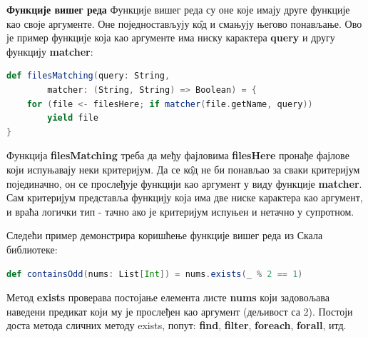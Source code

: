 \documentclass[12pt,oneside]{memoir}
\begin{document}
\begin{description}
	\item \textbf{Функције вишег реда} %
Функције вишег реда су оне које имају друге функције као своје аргументе. Оне поједностављују к\^{о}д и смањују његово понављање. Ово је пример функције која као аргументе има ниску карактера \textbf{query} и другу функцију \textbf{matcher}:
\begin{lstlisting}[language=Scala]
def filesMatching(query: String, 
		matcher: (String, String) => Boolean) = {
	for (file <- filesHere; if matcher(file.getName, query))
		yield file
}
\end{lstlisting}
Функција \textbf{filesMatching} треба да међу фајловима \textbf{filesHere} пронађе фајлове који испуњавају неки критеријум. Да се к\^{о}д не би понављао за сваки критеријум појединачно, он се прослеђује функцији као аргумент у виду функције \textbf{matcher}. Сам критеријум представља функцију која има две ниске карактера као аргумент, и враћа логички тип - тачно ако је критеријум испуњен и нетачно у супротном.
\par Следећи пример демонстрира коришћење функције вишег реда из Скала библиотеке:
\begin{lstlisting}[language=Scala]
def containsOdd(nums: List[Int]) = nums.exists(_ % 2 == 1)
\end{lstlisting}
Метод \textbf{exists} проверава постојање елемента листе \textbf{nums} који задовољава наведени предикат који му је прослеђен као аргумент (дељивост са 2).  Постоји доста метода сличних методу exists, попут: \textbf{find}, \textbf{filter}, \textbf{foreach}, \textbf{forall}, итд.


\end{description}
\end{document}
